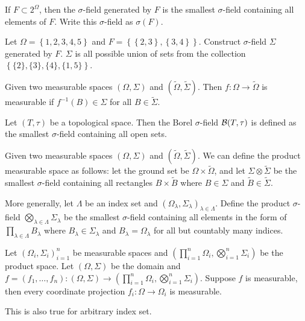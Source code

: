 \documentclass[a4paper]{article}
\begin{document}
\begin{defi}
  If $F \subset 2^\Omega$, then the $\sigma$-field generated by $F$ is the
  smallest $\sigma$-field containing all elements of $F$.
  Write this $\sigma$-field as $\sigma (F)$.
\end{defi}

\begin{eg}
  Let $\Omega = \left\{ 1, 2, 3, 4, 5 \right\}$ and
  $F = \left\{ \left\{ 2,3 \right\}, \left\{ 3,4 \right\} \right\}$.
  Construct $\sigma$-field $\Sigma$ generated by $F$.
  $\Sigma$ is all possible union of sets from the collection
  $\left\{ \{2\}, \{3\}, \{4\}, \{1, 5\}\right\}$.

\end{eg}

\begin{defi}
  Given two measurable spaces $(\Omega, \Sigma)$ and $(\tilde{\Omega},
    \tilde{\Sigma})$. Then $f : \Omega \to \tilde{\Omega}$ is measurable
  if $f^{-1} (B) \in \Sigma$ for all $B \in \tilde{\Sigma}$.
\end{defi}

\begin{defi}
  Let $(T, \tau)$ be a topological space. Then the Borel $\sigma$-field
  $\mathcal{B}(T, \tau)$ is defined as the smallest $\sigma$-field containing
  all open sets.
\end{defi}

\begin{defi}
  Given two measurable spaces $(\Omega, \Sigma)$ and
  $(\tilde{\Omega}, \tilde{\Sigma})$. We can define the product
  measurable space as follows: let the ground set be
  $\Omega \times \tilde{\Omega}$, and let
  $\Sigma \otimes \tilde{\Sigma}$ be the smallest $\sigma$-field
  containing all rectangles $B \times \tilde{B}$ where
  $B \in \Sigma$ and $\tilde{B} \in \tilde{\Sigma}$.

  More generally,
  let $\Lambda$ be an index set and $(\Omega_\lambda, \Sigma_\lambda)_{\lambda
      \in \Lambda}$. Define the product $\sigma$-field $\bigotimes_{\lambda
      \in \Lambda} \Sigma_\lambda$ be
  the smallest $\sigma$-field containing all elements
  in the form of $\prod_{\lambda \in \Lambda} B_\lambda$ where
  $B_\lambda \in \Sigma_\lambda$ and $B_\lambda = \Omega_\lambda$ for all
  but countably many indices.
\end{defi}

\begin{prop}
  Let $\left( \Omega_i, \Sigma_i \right)_{i=1}^n$ be measurable
  spaces and $\left( \prod_{i=1}^n \Omega_i, \bigotimes_{i=1}^n \Sigma_i
    \right)$ be the product space. Let $(\Omega, \Sigma)$ be the domain
  and $f = (f_1, \dots, f_n) : (\Omega, \Sigma) \to (\prod_{i=1}^n
    \Omega_i, \bigotimes_{i=1}^n \Sigma_i)$. Suppose $f$ is measurable,
  then every coordinate projection $f_i : \Omega \to \Omega_i$ is
  measurable.

  This is also true for arbitrary index set.
\end{prop}
\end{document}
